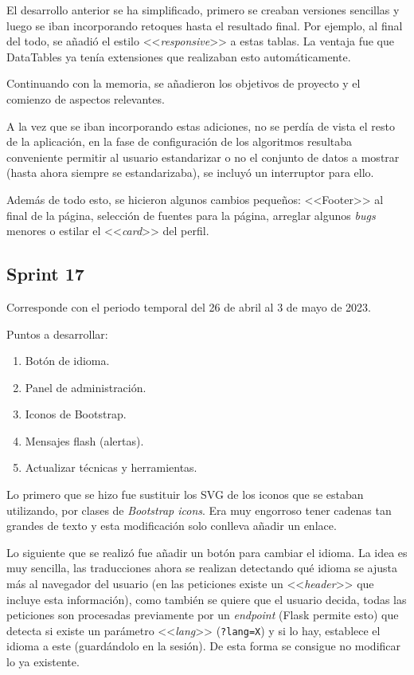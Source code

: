 El desarrollo anterior se ha simplificado, primero se creaban versiones
sencillas y luego se iban incorporando retoques hasta el resultado final. Por
ejemplo, al final del todo, se añadió el estilo <<\textit{responsive}>> a estas
tablas. La ventaja fue que DataTables ya tenía extensiones que realizaban esto
automáticamente.

Continuando con la memoria, se añadieron los objetivos de proyecto y el comienzo
de aspectos relevantes.

A la vez que se iban incorporando estas adiciones, no se perdía de vista el
resto de la aplicación, en la fase de configuración de los algoritmos resultaba
conveniente permitir al usuario estandarizar o no el conjunto de datos a mostrar
(hasta ahora siempre se estandarizaba), se incluyó un interruptor para ello.

Además de todo esto, se hicieron algunos cambios pequeños: <<Footer>> al final
de la página, selección de fuentes para la página, arreglar algunos
\textit{bugs} menores o estilar el <<\textit{card}>> del perfil.

\subsection{Sprint 17}
Corresponde con el periodo temporal del 26 de abril al 3 de mayo de 2023.

Puntos a desarrollar:
\begin{enumerate}
    \item Botón de idioma.
    \item Panel de administración.
    \item Iconos de Bootstrap.
    \item Mensajes flash (alertas).
    \item Actualizar técnicas y herramientas.
\end{enumerate}

Lo primero que se hizo fue sustituir los SVG de los iconos que se estaban
utilizando, por clases de \textit{Bootstrap icons}. Era muy engorroso tener
cadenas tan grandes de texto y esta modificación solo conlleva añadir un enlace.

Lo siguiente que se realizó fue añadir un botón para cambiar el idioma. La idea
es muy sencilla, las traducciones ahora se realizan detectando qué idioma se
ajusta más al navegador del usuario (en las peticiones existe un
<<\textit{header}>> que incluye esta información), como también se quiere que el
usuario decida, todas las peticiones son procesadas previamente por un
\textit{endpoint} (Flask permite esto) que detecta si existe un parámetro
<<\textit{lang}>> (\texttt{?lang=X}) y si lo hay, establece el idioma a este
(guardándolo en la sesión). De esta forma se consigue no modificar lo ya
existente.

